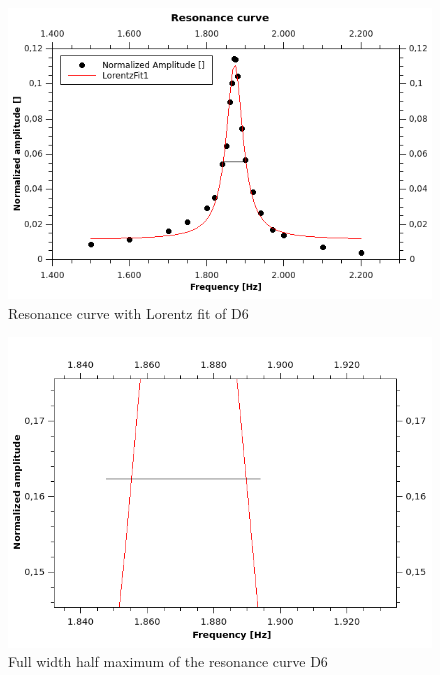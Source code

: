 \documentclass[12pt,a4paper]{article}
\begin{document}
\begin{multicols}{2}
\begin{figure}[H]
	\centering
	\includegraphics[scale=0.4]{../figures/Resonanzkurve.png}
	\caption{Resonance curve with Lorentz fit of D6}
	\label{fig:resonanzkurve}
\end{figure}

\begin{figure}[H]
	\centering
	\includegraphics[scale=0.4]{../figures/ResonanzkurveHalbwertsbreite.png}
	\caption{Full width half maximum of the resonance curve D6}
	\label{fig:resonanzkurvehmfuw}
\end{figure}

\end{multicols}
\end{document}
